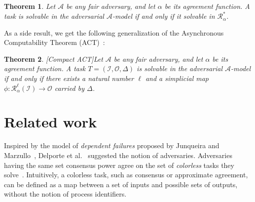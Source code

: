 \documentclass[a4paper]{article}
\newtheorem{theorem}{Theorem}
\newcommand{\myparagraph}[1]{\vspace{6pt}\noindent \textbf{#1}}
\def\A{\ensuremath{\mathcal{A}}}
\def\R{\ensuremath{\mathcal{R}}}
\def\I{\ensuremath{\mathcal{I}}}
\def\O{\ensuremath{\mathcal{O}}}
\def\O {\mathcal{O}}
\def\I {\mathcal{I}}
\begin{document}
\begin{theorem}\label{ref:main}
Let $\A$ be any fair adversary, and let $\alpha$ be its agreement
function.
A task is solvable in the adversarial $\A$-model if and only if it
solvable in  $\R_{\alpha}^*$.
\end{theorem}

As a side result, we get the following generalization of the
Asynchronous Computability Theorem (ACT)~\cite{HS99}:

\begin{theorem}{[Compact ACT]}\label{ref:cact}
Let $\A$ be any fair adversary, and let $\alpha$ be its agreement
function.
A task $T=(\I,\O,\Delta)$ is solvable in the adversarial $\A$-model
if and only if there exists a natural number $\ell$ and a simplicial map
$\phi: \R_{\alpha}^{\ell}(\I) \rightarrow \O$ carried by $\Delta$.
\end{theorem}  


\section{Related work}
\label{sec:related}

%
%
Inspired by the model of \emph{dependent failures}
proposed by Junqueira and Marzullo~\cite{JM07-cores},
Delporte et al.~\cite{DFGT11} suggested the notion of adversaries.
Adversaries having the same set consensus power agree on the set
of \emph{colorless} tasks they solve~\cite{DFGT11,GK11}.
Intuitively, a colorless task, such as consensus or approximate agreement, %
can be defined as a map between a set of inputs and possible sets of
outputs, without the notion of process identifiers.

%  
\end{document}
